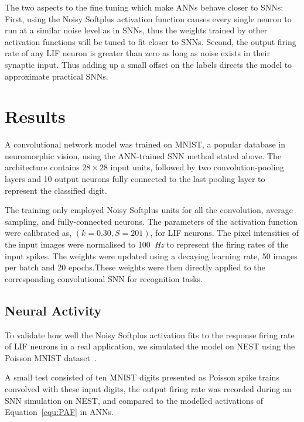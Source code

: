 \documentclass{article}
\begin{document}
The two aspects to the fine tuning which make ANNs behave closer to SNNs:
First, using the Noisy Softplus activation function causes every single neuron to run at a similar noise level as in SNNs, thus the weights trained by other activation functions will be tuned to fit closer to SNNs.
Second, the output firing rate of any LIF neuron is greater than zero as long as noise exists in their synaptic input. Thus adding up a small offset on the labels directs the model to approximate practical SNNs. 

\section{Results}
\label{sec:result}
A convolutional network model was trained on MNIST,
a popular database in neuromorphic vision, using the ANN-trained SNN method stated above.
The architecture contains $28\times28$ input units, followed by two convolution-pooling layers and 10 output neurons fully connected to the last pooling layer to represent the classified digit.

The training only employed Noisy Softplus units for all the convolution, average sampling, and fully-connected neurons. %
The parameters of the activation function were calibrated as, $(k=0.30, S=201)$,  for LIF neurons.
The pixel intensities of the input images were normalised to 100~\textit{Hz} to represent the firing rates of the input spikes.
The weights were updated using a decaying learning rate, 50 images per batch and 20 epochs.These weights were then directly applied to the corresponding convolutional SNN  for recognition tasks.


\subsection{Neural Activity}
To validate how well the Noisy Softplus activation fits to the response firing rate of LIF neurons in a real application, we simulated the model on NEST using the Poisson MNIST dataset~\cite{liu2016bench}.%

A small test consisted of ten MNIST digits presented as Poisson spike trains  convolved with these input digits, the output firing rate was recorded during an SNN simulation on NEST, and compared to the modelled activations of Equation~\ref{equ:PAF} in ANNs.
\end{document}
